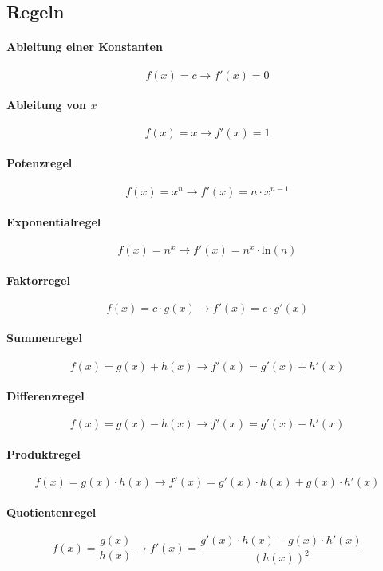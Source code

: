 	\subsection{Regeln}
		\paragraph{Ableitung einer Konstanten}
			\[ f(x) = c \rightarrow f'(x) = 0 \]

		\paragraph{Ableitung von $ x $}
			\[ f(x) = x \rightarrow f'(x) = 1 \]

		\paragraph{Potenzregel}
			\[ f(x) = x ^ n \rightarrow f'(x) = n \cdot x ^ { n - 1 } \]

		\paragraph{Exponentialregel}
			\[ f(x) = n ^ x \rightarrow f'(x) = n ^ x \cdot \text{ln}(n) \]

		\paragraph{Faktorregel}
			\[ f(x) = c \cdot g(x) \rightarrow f'(x) = c \cdot g'(x) \]

		\paragraph{Summenregel}
			\[ f(x) = g(x) + h(x) \rightarrow f'(x) = g'(x) + h'(x) \]

		\paragraph{Differenzregel}
			\[ f(x) = g(x) - h(x) \rightarrow f'(x) = g'(x) - h'(x) \]

		\paragraph{Produktregel}
			\[ f(x) = g(x) \cdot h(x) \rightarrow f'(x) = g'(x) \cdot h(x) + g(x) \cdot h'(x) \]

		\paragraph{Quotientenregel}
			\[ f(x) = \frac{g(x)}{h(x)} \rightarrow f'(x) = \frac{g'(x) \cdot h(x) - g(x) \cdot h'(x)}{(h(x)) ^ 2} \]

